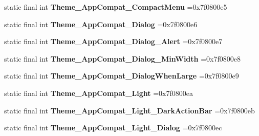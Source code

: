 \begin{DoxyCompactItemize}
\item 
\hypertarget{classcheck_1_1test_1_1_r_1_1style_a184cb5222a9378744064d8506fde9b3b}{}static final int {\bfseries Theme\+\_\+\+App\+Compat\+\_\+\+Compact\+Menu} =0x7f0800e5\label{classcheck_1_1test_1_1_r_1_1style_a184cb5222a9378744064d8506fde9b3b}

\item 
\hypertarget{classcheck_1_1test_1_1_r_1_1style_ad0509f7652aeeea046bc246a0a119847}{}static final int {\bfseries Theme\+\_\+\+App\+Compat\+\_\+\+Dialog} =0x7f0800e6\label{classcheck_1_1test_1_1_r_1_1style_ad0509f7652aeeea046bc246a0a119847}

\item 
\hypertarget{classcheck_1_1test_1_1_r_1_1style_ae6b25a747a8af4485ea157519797bc68}{}static final int {\bfseries Theme\+\_\+\+App\+Compat\+\_\+\+Dialog\+\_\+\+Alert} =0x7f0800e7\label{classcheck_1_1test_1_1_r_1_1style_ae6b25a747a8af4485ea157519797bc68}

\item 
\hypertarget{classcheck_1_1test_1_1_r_1_1style_ada321372af974e920c060f7d81fbf58e}{}static final int {\bfseries Theme\+\_\+\+App\+Compat\+\_\+\+Dialog\+\_\+\+Min\+Width} =0x7f0800e8\label{classcheck_1_1test_1_1_r_1_1style_ada321372af974e920c060f7d81fbf58e}

\item 
\hypertarget{classcheck_1_1test_1_1_r_1_1style_aaa9b616aa0f9702deb17a377edb8c1a2}{}static final int {\bfseries Theme\+\_\+\+App\+Compat\+\_\+\+Dialog\+When\+Large} =0x7f0800e9\label{classcheck_1_1test_1_1_r_1_1style_aaa9b616aa0f9702deb17a377edb8c1a2}

\item 
\hypertarget{classcheck_1_1test_1_1_r_1_1style_a2e4ed69d7aac8ae65187bb6e7a25f165}{}static final int {\bfseries Theme\+\_\+\+App\+Compat\+\_\+\+Light} =0x7f0800ea\label{classcheck_1_1test_1_1_r_1_1style_a2e4ed69d7aac8ae65187bb6e7a25f165}

\item 
\hypertarget{classcheck_1_1test_1_1_r_1_1style_a75c3ca0d1db474d95ce672c76d0d8b24}{}static final int {\bfseries Theme\+\_\+\+App\+Compat\+\_\+\+Light\+\_\+\+Dark\+Action\+Bar} =0x7f0800eb\label{classcheck_1_1test_1_1_r_1_1style_a75c3ca0d1db474d95ce672c76d0d8b24}

\item 
\hypertarget{classcheck_1_1test_1_1_r_1_1style_ab0e0857f8b24d85d07f315b3bf9006c4}{}static final int {\bfseries Theme\+\_\+\+App\+Compat\+\_\+\+Light\+\_\+\+Dialog} =0x7f0800ec\label{classcheck_1_1test_1_1_r_1_1style_ab0e0857f8b24d85d07f315b3bf9006c4}


\end{DoxyCompactItemize}
